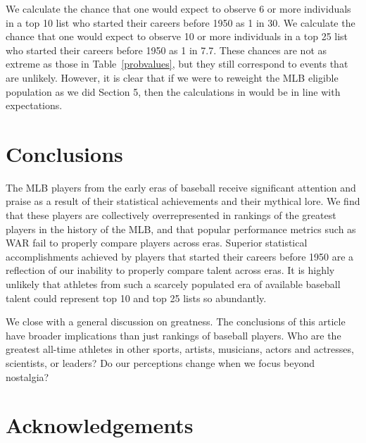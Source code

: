 \documentclass[11pt]{article}\usepackage[]{graphicx}\usepackage[]{color}
\begin{document}
We calculate the chance that one would expect to 
observe 6 or more individuals in a top 10 list who started their careers 
before 1950 as 1 in 30. 
We calculate the chance that one would expect to observe 10 or more 
individuals in a top 25 list who started their careers before 1950 as 
1 in 7.7.  These chances are not as extreme 
as those in Table~\ref{probvalues}, but they still correspond to events 
that are unlikely.  However, it is clear that if we were to reweight the 
MLB eligible population as we did Section 5, then the calculations in 
\citet{berry1999eras} would be in line with expectations.




\section{Conclusions}

The MLB players from the early eras of baseball receive significant attention 
and praise as a result of their statistical achievements and their mythical 
lore.  We find that these players are collectively overrepresented in 
rankings of the greatest players in the history of the MLB, and that popular 
performance metrics such as WAR fail to properly compare players across eras.  
Superior statistical accomplishments achieved 
by players that started their careers before 1950 are a reflection of our 
inability to properly compare talent across eras.  It is highly unlikely that 
athletes from such a scarcely populated era of available baseball talent 
could represent top 10 and top 25 lists so abundantly. 

We close with a general discussion on greatness.  The conclusions of this 
article have broader implications than just rankings of baseball players.  
Who are the greatest all-time athletes in other sports, 
artists, 
musicians, 
actors and actresses,
scientists, or 
leaders?  
Do our perceptions change when we focus beyond nostalgia?  



\section*{Acknowledgements}
\end{document}
